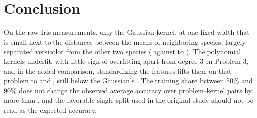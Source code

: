 \section{Conclusion}

On the raw Iris measurements, only the Gaussian kernel, at one fixed width that is small next to the distances between the means of neighboring species, largely separated versicolor from the other two species ( against  to ). The polynomial kernels underfit, with little sign of overfitting apart from degree 3 on Problem 3, and in the added comparison, standardizing the features lifts them on that problem to  and , still below the Gaussian's . The training share between 50\% and 90\% does not change the observed average accuracy over problem--kernel pairs by more than , and the favorable single split used in the original study should not be read as the expected accuracy.
